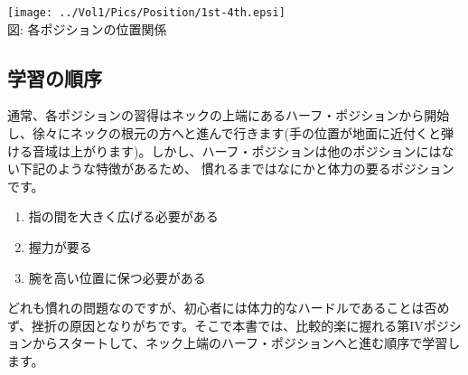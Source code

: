 \begin{flushleft}
\begin{minipage}{280pt}
\end{minipage}
\hfill
\begin{minipage}{140pt}
\begin{center}
\texttt{[image: ../Vol1/Pics/Position/1st-4th.epsi]}\\
{\flushleft\small 図\thefigure : 各ポジションの位置関係\\}
\end{center}
\end{minipage}
\end{flushleft}

\subsection{学習の順序}
通常、各ポジションの習得はネックの上端にあるハーフ・ポジションから開始し、徐々にネックの根元の方へと進んで行きます(手の位置が地面に近付くと弾ける音域は上がります)。しかし、ハーフ・ポジションは他のポジションにはない下記のような特徴があるため、
慣れるまではなにかと体力の要るポジションです。

\begin{enumerate}
\item 指の間を大きく広げる必要がある
\item 握力が要る
\item 腕を高い位置に保つ必要がある
\end{enumerate}

どれも慣れの問題なのですが、初心者には体力的なハードルであることは否めず、挫折の原因となりがちです。そこで本書では、比較的楽に握れる第IVポジションからスタートして、ネック上端のハーフ・ポジションへと進む順序で学習します。



